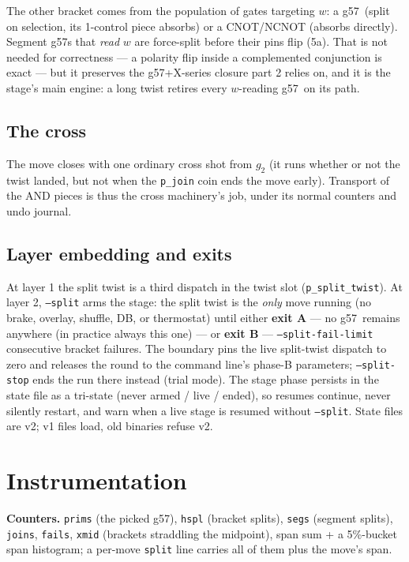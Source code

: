 \documentclass[11pt]{article}
\newcommand{\g}{\textsf{g57}}
\begin{document}
The other bracket comes from the population of gates targeting $w$: a \g\
(split on selection, its 1-control piece absorbs) or a CNOT/NCNOT (absorbs
directly). Segment \g s that \emph{read} $w$ are force-split before their
pins flip (5a). That is not needed for correctness --- a polarity flip inside a
complemented conjunction is exact --- but it preserves the \g{}+X-series
closure part 2 relies on, and it is the stage's main engine: a long twist
retires every $w$-reading \g\ on its path.

\subsection{The cross}
The move closes with one ordinary cross shot from $g_2$ (it runs whether or
not the twist landed, but not when the \texttt{p\_join} coin ends the move
early). Transport of the AND pieces is thus the cross machinery's job, under
its normal counters and undo journal.

\subsection{Layer embedding and exits}
At layer 1 the split twist is a third dispatch in the twist slot
(\texttt{p\_split\_twist}). At layer 2, \texttt{--split} arms the stage: the
split twist is the \emph{only} move running (no brake, overlay, shuffle, DB,
or thermostat) until either \textbf{exit A} --- no \g\ remains anywhere (in
practice always this one) --- or \textbf{exit B} --- \texttt{--split-fail-limit}
consecutive bracket failures. The boundary pins the live split-twist dispatch
to zero and releases the round to the command line's phase-B parameters;
\texttt{--split-stop} ends the run there instead (trial mode). The stage
phase persists in the state file as a tri-state (never armed / live / ended),
so resumes continue, never silently restart, and warn when a live stage is
resumed without \texttt{--split}. State files are v2; v1 files load, old
binaries refuse v2.

\section{Instrumentation}

\textbf{Counters.} \texttt{prims} (the picked \g), \texttt{hspl} (bracket
splits), \texttt{segs} (segment splits), \texttt{joins}, \texttt{fails},
\texttt{xmid} (brackets straddling the midpoint), span sum + a 5\%-bucket
span histogram; a per-move \texttt{split} line carries all of them plus the
move's span.
\end{document}
